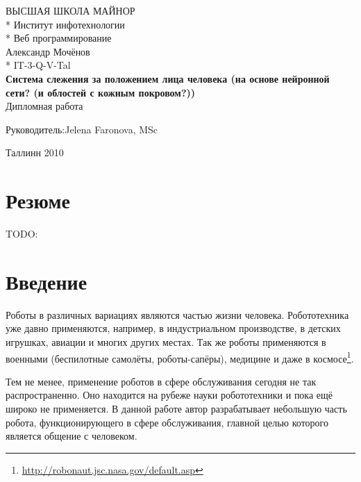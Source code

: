 \documentclass[12pt]{report}
\begin{document}

\begin{titlepage}
  \begin{center}
	\uppercase{Высшая школа майнор}\\*
	Институт инфотехнологии\\*
	Веб программирование\\[8cm]
	Александр Мочёнов\\*
	IT-3-Q-V-Tal\\[0.5cm]
	\large
	\textbf{Система слежения за положением лица человека (на основе нейронной сети? (и облостей с кожным покровом?))}\\[1cm]
	\normalsize
	Дипломная работа\\[2cm]
	\begin{flushright}
		Руководитель:Jelena Faronova, MSc\\[7cm]
	\end{flushright}
	Таллинн 2010
  \end{center}
\end{titlepage}

\tableofcontents{\thispagestyle{fancyplain}}

\chapter*{Резюме}
\thispagestyle{fancy}

TODO:


\chapter*{Введение}
\thispagestyle{fancy}

Роботы в различных вариациях являются частью жизни человека. Робототехника уже
давно применяются, например, в индустриальном производстве, в детских игрушках,
авиации и многих других местах. Так же роботы применяются в военными (беспилотные
самолёты, роботы-сапёры), медицине и даже в космосе\footnote{\url{http://robonaut.jsc.nasa.gov/default.asp}}.

Тем не менее, применение роботов в сфере обслуживания сегодня не так распространенно. Оно находится на рубеже науки робототехники и пока ещё широко не применяется. В данной работе автор разрабатывает небольшую
часть робота, функционирующего в сфере обслуживания, главной целью которого
является общение с человеком. 
\end{document}
